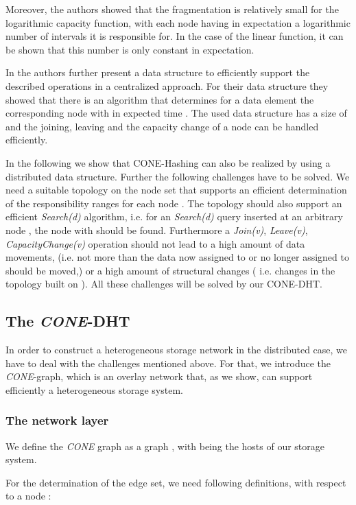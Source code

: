 \documentclass[11pt]{article}
\begin{document}
Moreover, the authors showed that the fragmentation is relatively small for the  logarithmic
capacity function, with each node having in expectation a logarithmic number of intervals it is responsible for.
In the case of the linear function, it can be shown that this number is only constant in expectation.

In \cite{cone} the authors further present a data structure to efficiently support the described
operations in a centralized approach. For their data structure they showed that
there is an algorithm that determines for a data element  the
corresponding node  with  in expected time . The used data structure has a size of  and the
joining, leaving and the capacity change of a node can be handled efficiently.


In the following we show that CONE-Hashing can also be realized by using a
distributed data structure. Further the following challenges have to be
solved. We need a suitable topology on the node set  that supports an
efficient determination of the responsibility ranges  for each node
 . The topology should also support an efficient \emph{Search(d)}
algorithm, i.e. for an \emph{Search(d)} query inserted at an arbitrary node
, the node  with  should be found. Furthermore a
\emph{Join(v)}, \emph{Leave(v)}, \emph{CapacityChange(v)} operation should
not lead to a high amount of data movements, (i.e. not more than the data
now assigned to  or no longer assigned to  should be moved,) or a high amount of structural changes ( i.e. changes in the topology built on
). All these challenges will be solved by our CONE-DHT.

\subsection{The \emph{CONE}-DHT}\label{cone}

In order to construct a heterogeneous storage network in the distributed case, we have to deal with the challenges mentioned above.
For that, we introduce the  \emph{CONE}-graph, which is an overlay network that, as we show, can support efficiently a heterogeneous storage system.

\subsubsection{The network layer}

We define the \emph{CONE} graph as a graph , with  being the hosts of our storage system.

For the determination of the edge set, we need following definitions, with respect to a node :
\end{document}
